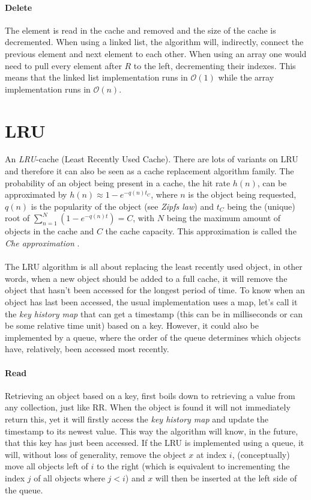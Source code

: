 \documentclass[pdftex,a4paper,12pt,twoside]{report}
\begin{document}
\paragraph{Delete} The element is read in the cache and removed and the size of the cache is decremented. When using a linked list, the algorithm will, indirectly, connect the previous element and next element to each other. When using an array one would need to pull every element after $R$ to the left, decrementing their indexes. This means that the linked list implementation runs in $\mathcal{O}(1)$ while the array implementation runs in $\mathcal{O}(n)$.
\section{LRU}
An \emph{LRU}-cache (Least Recently Used Cache). There are lots of variants on LRU and therefore it can also be seen as a cache replacement algorithm family. The probability of an object being present in a cache, the hit rate $h(n)$, can be approximated by 
$h(n) \approx 1 - e^{-q(n)t_C}$, where $n$ is the object being requested, $q(n)$ is the popularity of the object (see \emph{Zipfs law}) and $t_C$ being the (unique) root of 
$\sum_{n=1}^N(1-e^{-q(n)t})=C$, with $N$ being the maximum amount of objects in the cache and $C$ the cache capacity. This approximation is called the \emph{Che approximation} \citep{fricker2012versatile}.
\\\\
The LRU algorithm is all about replacing the least recently used object, in other words, when a new object should be added to a full cache, it will remove the object that hasn't been accessed for the longest period of time. To know when an object has last been accessed, the usual implementation uses a map, let's call it the \emph{key history map} that can get a timestamp (this can be in milliseconds or can be some relative time unit) based on a key. However, it could also be implemented by a queue, where the order of the queue determines which objects have, relatively, been accessed most recently.
\paragraph{Read} Retrieving an object based on a key, first boils down to retrieving a value from any collection, just like RR. When the object is found it will not immediately return this, yet it will firstly access the \emph{key history map} and update the timestamp to its newest value. This way the algorithm will know, in the future, that this key has just been accessed. If the LRU is implemented using a queue, it will, without loss of generality, remove the object $x$ at index $i$, (conceptually) move all objects left of $i$ to the right (which is equivalent to incrementing the index $j$ of all objects where $j < i$) and $x$ will then be inserted at the left side of the queue.
\end{document}

